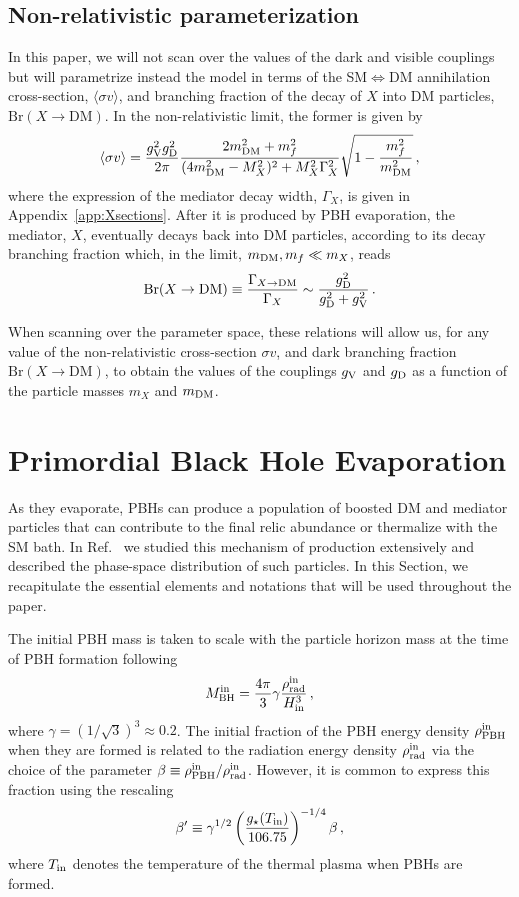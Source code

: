 \documentclass[aps,prd,reprint,twocolumn,preprintnumbers,floatfix,nofootinbib]{revtex4-1}
\newcommand{\be}{\begin{equation}}
\newcommand{\ee}{\end{equation}}
\newcommand{\gV}{g_{\rm V}}
\newcommand{\gD}{g_{\rm D}}
\newcommand{\mDM}{m_{\rm DM}}
\newcommand{\MBH}{M_{\rm BH}}
\begin{document}
\subsection{Non-relativistic parameterization}
In this paper, we will not scan over the values of the dark and visible couplings but will parametrize instead the model in terms of the SM$\Longleftrightarrow$DM annihilation cross-section, $\langle\sigma v\rangle$, and branching fraction of the decay of $X$ into DM particles, $\mathrm{Br}(X\to \mathrm{DM})$. In the non-relativistic limit, the former is given by
\be\label{eq:sigmav}
\langle\sigma v\rangle = \frac{\gV^2\gD^2}{2\pi}\frac{2 \mDM^2+m_f^2}{(4\mDM^2-M_X^2)^2+M_X^2 \Gamma_X^2}\sqrt{1 -\frac{m_f^2}{\mDM^2}}\,,
\ee
where the expression of the mediator decay width, $\Gamma_X$, is given in Appendix~\ref{app:Xsections}.
After it is produced by PBH evaporation, the mediator, $X$, eventually decays back into DM particles, according to its decay branching fraction which, in the limit, $\mDM,m_f\ll m_X$, reads
\be
\mathrm{Br}(X\to \mathrm{DM})\equiv \frac{\Gamma_{X\to \mathrm{DM}}}{\Gamma_X}\sim\frac{\gD^2}{\gD^2+\gV^2}\,.
\ee

When scanning over the parameter space, these relations will allow us, for any value of the non-relativistic cross-section $\sigma v$, and dark branching fraction $\mathrm{Br}(X\to \mathrm{DM})$, to obtain the values of the couplings $\gV$ and $\gD$ as a function of the particle masses $m_X$ and $\mDM$.



\section {Primordial Black Hole Evaporation}
\label{sec:PBH}

As they evaporate, PBHs can produce a population of boosted DM and mediator particles that can contribute to the final relic abundance or thermalize with the SM bath. In Ref.~\cite{paper1} we studied this mechanism of production extensively and described the phase-space distribution of such particles. In this Section, we recapitulate the essential elements and notations that will be used throughout the paper.

The initial PBH mass is taken to scale with the particle horizon mass at the time of PBH formation following~\cite{Carr:2020xqk}
\begin{align}
 \MBH^{\rm in} = \frac{4\pi}{3} \gamma\frac{\rho_{\rm rad}^{\rm in}}{H_{\rm in}^3}\,,
\end{align}
where $\gamma=(1/\sqrt{3})^3\approx 0.2$. The initial fraction of the PBH energy density $\rho^{\rm in}_{\rm PBH}$ when they are formed is related to the radiation energy density $\rho_{\rm rad}^{\rm in}$ via the choice of the parameter $\beta\equiv\rho^{\rm in}_{\rm PBH}/\rho_{\rm rad}^{\rm in} $. However, it is common to express this fraction using the rescaling
\begin{align}
 \beta^\prime \equiv \gamma^{1/2}\left(\frac{g_\star (T_{\rm in})}{106.75}\right)^{-1/4}\beta\,,
\end{align}
where $T_{\rm in}$ denotes {the temperature of the thermal plasma} when PBHs are formed. 
\end{document}
